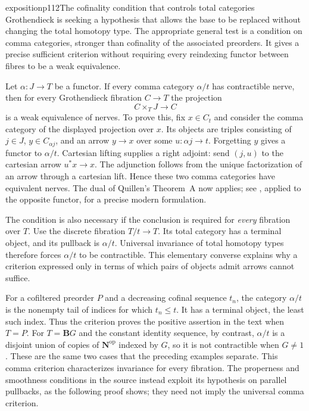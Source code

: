 \begin{dcomment}{exposition}{p112}{The cofinality condition that controls total categories}
Grothendieck is seeking a hypothesis that allows the base to be replaced without changing the total homotopy type. The appropriate general test is a condition on comma categories, stronger than cofinality of the associated preorders. It gives a precise sufficient criterion without requiring every reindexing functor between fibres to be a weak equivalence.

Let $\alpha:J\to T$ be a functor. If every comma category $\alpha/t$ has contractible nerve, then for every Grothendieck fibration $C\to T$ the projection
\[
 C\times_T J\longrightarrow C
\]
is a weak equivalence of nerves. To prove this, fix $x\in C_t$ and consider the comma category of the displayed projection over $x$. Its objects are triples consisting of $j\in J$, $y\in C_{\alpha j}$, and an arrow $y\to x$ over some $u:\alpha j\to t$. Forgetting $y$ gives a functor to $\alpha/t$. Cartesian lifting supplies a right adjoint: send $(j,u)$ to the cartesian arrow $u^*x\to x$. The adjunction follows from the unique factorization of an arrow through a cartesian lift. Hence these two comma categories have equivalent nerves. The dual of Quillen's Theorem~A now applies; see \citet[Corollary~4.1.3.3]{Lurie2009HTT}, applied to the opposite functor, for a precise modern formulation.

The condition is also necessary if the conclusion is required for \emph{every} fibration over $T$. Use the discrete fibration $T/t\to T$. Its total category has a terminal object, and its pullback is $\alpha/t$. Universal invariance of total homotopy types therefore forces $\alpha/t$ to be contractible. This elementary converse explains why a criterion expressed only in terms of which pairs of objects admit arrows cannot suffice.

For a cofiltered preorder $P$ and a decreasing cofinal sequence $t_n$, the category $\alpha/t$ is the nonempty tail of indices for which $t_n\le t$. It has a terminal object, the least such index. Thus the criterion proves the positive assertion in the text when $T=P$. For $T=\mathbf BG$ and the constant identity sequence, by contrast, $\alpha/t$ is a disjoint union of copies of $\mathbf N^{\mathrm{op}}$ indexed by $G$, so it is not contractible when $G\ne1$. These are the same two cases that the preceding examples separate. This comma criterion characterizes invariance for every fibration. The properness and smoothness conditions in the source instead exploit its hypothesis on parallel pullbacks, as the following proof shows; they need not imply the universal comma criterion.
\end{dcomment}

